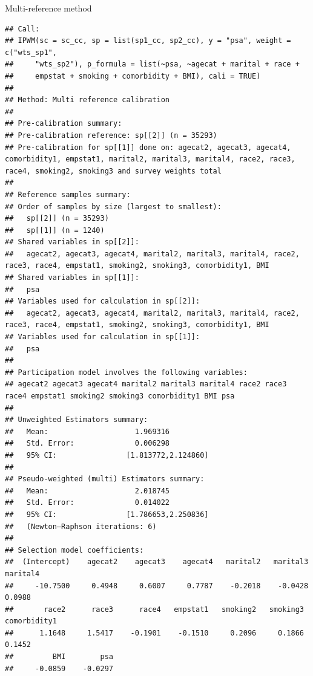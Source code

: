 \documentclass[
  ignorenonframetext,
]{beamer}
\begin{document}
\begin{frame}[fragile]{Multi-reference method}
\begin{verbatim}
## Call:
## IPWM(sc = sc_cc, sp = list(sp1_cc, sp2_cc), y = "psa", weight = c("wts_sp1", 
##     "wts_sp2"), p_formula = list(~psa, ~agecat + marital + race + 
##     empstat + smoking + comorbidity + BMI), cali = TRUE)
## 
## Method: Multi reference calibration
## 
## Pre-calibration summary:
## Pre-calibration reference: sp[[2]] (n = 35293)
## Pre-calibration for sp[[1]] done on: agecat2, agecat3, agecat4, comorbidity1, empstat1, marital2, marital3, marital4, race2, race3, race4, smoking2, smoking3 and survey weights total
## 
## Reference samples summary:
## Order of samples by size (largest to smallest):
##   sp[[2]] (n = 35293)
##   sp[[1]] (n = 1240)
## Shared variables in sp[[2]]:
##   agecat2, agecat3, agecat4, marital2, marital3, marital4, race2, race3, race4, empstat1, smoking2, smoking3, comorbidity1, BMI
## Shared variables in sp[[1]]:
##   psa
## Variables used for calculation in sp[[2]]:
##   agecat2, agecat3, agecat4, marital2, marital3, marital4, race2, race3, race4, empstat1, smoking2, smoking3, comorbidity1, BMI
## Variables used for calculation in sp[[1]]:
##   psa
## 
## Participation model involves the following variables:
## agecat2 agecat3 agecat4 marital2 marital3 marital4 race2 race3 race4 empstat1 smoking2 smoking3 comorbidity1 BMI psa 
## 
## Unweighted Estimators summary:
##   Mean:                    1.969316
##   Std. Error:              0.006298
##   95% CI:                [1.813772,2.124860]
## 
## Pseudo-weighted (multi) Estimators summary:
##   Mean:                    2.018745
##   Std. Error:              0.014022
##   95% CI:                [1.786653,2.250836]
##   (Newton–Raphson iterations: 6)
## 
## Selection model coefficients:
##  (Intercept)    agecat2    agecat3    agecat4   marital2   marital3   marital4
##     -10.7500     0.4948     0.6007     0.7787    -0.2018    -0.0428     0.0988
##       race2      race3      race4   empstat1   smoking2   smoking3 comorbidity1
##      1.1648     1.5417    -0.1901    -0.1510     0.2096     0.1866       0.1452
##         BMI        psa
##     -0.0859    -0.0297
\end{verbatim}
\end{frame}
\end{document}
